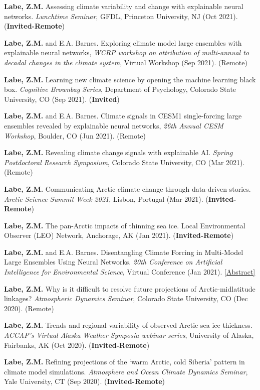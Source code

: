 \documentclass[margin,line,palatino,courier,10pt]{res}
\begin{document}
\begin{resume}
\begin{etaremune}[leftmargin=0in,topsep=0in,parsep=0in]
\item \textbf{Labe, Z.M.} Assessing climate variability and change with explainable neural networks. \textit{Lunchtime Seminar}, GFDL, Princeton University, NJ (Oct 2021). (\textbf{Invited-Remote})
\item \textbf{Labe, Z.M.} and E.A. Barnes. Exploring climate model large ensembles with explainable neural networks, \textit{WCRP workshop on attribution of multi-annual to decadal changes in the climate system}, Virtual Workshop (Sep 2021). (Remote)
\item \textbf{Labe, Z.M.} Learning new climate science by opening the machine learning black box. \textit{Cognitive Brownbag Series}, Department of Psychology, Colorado State University, CO (Sep 2021). (\textbf{Invited})
\item \textbf{Labe, Z.M.} and E.A. Barnes. Climate signals in CESM1 single-forcing large ensembles revealed by explainable neural networks, \textit{26th Annual CESM Workshop}, Boulder, CO (Jun 2021). (Remote)
\item \textbf{Labe, Z.M.} Revealing climate change signals with explainable AI. \textit{Spring Postdoctoral Research Symposium}, Colorado State University, CO (Mar 2021). (Remote)
\item \textbf{Labe, Z.M.} Communicating Arctic climate change through data-driven stories. \textit{Arctic Science Summit Week 2021}, Lisbon, Portugal (Mar 2021). (\textbf{Invited-Remote})
\item \textbf{Labe, Z.M.} The pan-Arctic impacts of thinning sea ice. Local Environmental Observer (LEO) Network, Anchorage, AK (Jan 2021). (\textbf{Invited-Remote})
\item \textbf{Labe, Z.M.} and E.A. Barnes. Disentangling Climate Forcing in Multi-Model Large Ensembles Using Neural Networks. \textit{20th Conference on Artificial Intelligence for Environmental Science}, Virtual Conference (Jan 2021). \href{https://ams.confex.com/ams/101ANNUAL/meetingapp.cgi/Paper/379553}{[Abstract]}
\item \textbf{Labe, Z.M.} Why is it difficult to resolve future projections of Arctic-midlatitude linkages? \textit{Atmospheric Dynamics Seminar}, Colorado State University, CO (Dec 2020). (Remote)
\item \textbf{Labe, Z.M.} Trends and regional variability of observed Arctic sea ice thickness. \textit{ACCAP’s Virtual Alaska Weather Symposia webinar series}, University of Alaska, Fairbanks, AK (Oct 2020). (\textbf{Invited-Remote})
\item \textbf{Labe, Z.M.} Refining projections of the `warm Arctic, cold Siberia' pattern in climate model simulations. \textit{Atmosphere and Ocean Climate Dynamics Seminar}, Yale University, CT (Sep 2020). (\textbf{Invited-Remote})

\end{etaremune}
\end{resume}
\end{document}
